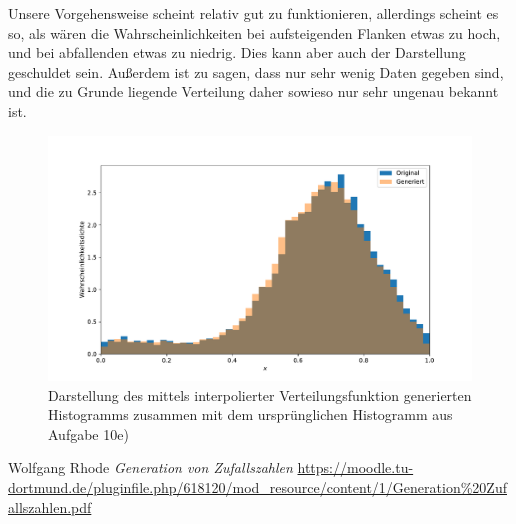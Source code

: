\documentclass[a4paper, 11pt]{article}
\begin{document}
Unsere Vorgehensweise scheint relativ gut zu funktionieren, allerdings scheint es so, als wären die Wahrscheinlichkeiten bei aufsteigenden Flanken etwas zu hoch, und bei abfallenden etwas zu niedrig. Dies kann aber auch der Darstellung geschuldet sein. Außerdem ist zu sagen, dass nur sehr wenig Daten gegeben sind, und die zu Grunde liegende Verteilung daher sowieso nur sehr ungenau bekannt ist.
\begin{figure}
    \centering
    \includegraphics[width=\textwidth]{../A10/A10e.pdf}
    \caption{Darstellung des mittels interpolierter Verteilungsfunktion generierten Histogramms zusammen mit dem ursprünglichen Histogramm aus Aufgabe 10e)}
    \label{fig:a10e}
\end{figure}
\FloatBarrier


\begin{thebibliography}{9}
    Wolfgang Rhode
    \textit{Generation von Zufallszahlen}
    \url{https://moodle.tu-dortmund.de/pluginfile.php/618120/mod_resource/content/1/Generation\%20Zufallszahlen.pdf}
\end{thebibliography}
\end{document}
